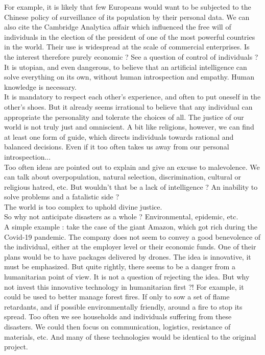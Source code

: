 For example, it is likely that few Europeans would want to be subjected to the Chinese policy of surveillance of its population by their personal data. We can also cite the Cambridge Analytica affair which influenced the free will of individuals in the election of the president of one of the most powerful countries in the world. Their use is widespread at the scale of commercial enterprises. Is the interest therefore purely economic ? See a question of control of individuals ?\\

It is utopian, and even dangerous, to believe that an artificial intelligence can solve everything on its own, without human introspection and empathy. Human knowledge is necessary.\\

It is mandatory to respect each other's experience, and often to put oneself in the other's shoes. But it already seems irrational to believe that any individual can appropriate the personality and tolerate the choices of all. The justice of our world is not truly just and omniscient. A bit like religions, however, we can find at least one form of guide, which directs individuals towards rational and balanced
decisions. Even if it too often takes us away from our personal introspection...\\

Too often ideas are pointed out to explain and give an excuse to malevolence. We can talk about overpopulation, natural selection, discrimination, cultural or religious hatred, etc. But wouldn't that be a lack of intelligence ? An inability to solve problems and a fatalistic side ?\\

The world is too complex to uphold divine justice.\\
So why not anticipate disasters as a whole ? Environmental, epidemic, etc.\\

A simple example : take the case of the giant Amazon, which got rich during the Covid-19 pandemic. The company does not seem to convey a good benevolence of the individual, either at the employer level or their economic funds. One of their plans would be to have packages delivered by drones. The idea is innovative, it must be emphasized. But quite rightly, there seems to be a danger from a humanitarian point of view. It is not a question of rejecting the idea. But why not invest this innovative technology in humanitarian first ?! For example, it could be used to better manage forest fires. If only to sow a set of flame retardants, and if possible environmentally friendly, around a fire to stop its spread. Too often we see households and individuals suffering from these disasters. We could then focus on communication, logistics, resistance of materials, etc. And many of these technologies would be identical to the original project.\\

